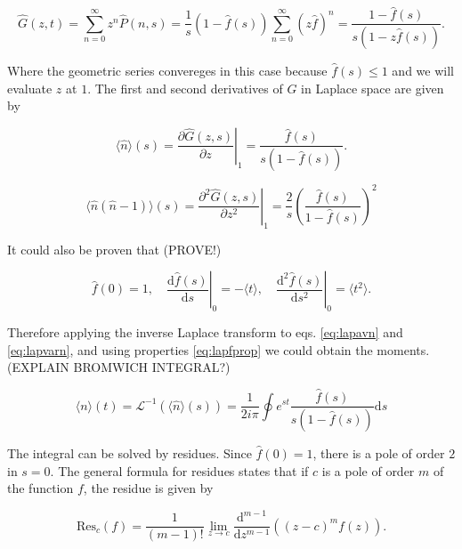 \begin{equation}
  \label{eq:lapG}
  \hat{G}(z,t) = \sum_{n=0}^{\infty}z^n\hat{P}(n,s) = \frac{1}{s}(1-\hat{f}(s))\sum_{n=0}^{\infty}(z\hat{f})^n=\frac{1-\hat{f}(s)}{s(1-z\hat{f}(s))}.
\end{equation}

Where the geometric series convereges in this case because $\hat{f}(s)\leq1$ and we will evaluate $z$ at $1$. The first and second derivatives of $G$ in Laplace space are given by

\begin{equation}
  \label{eq:lapavn}
  \langle\hat{n}\rangle(s) = \left.\frac{\partial\hat{G}(z,s)}{\partial z}\right|_1 = \frac{\hat{f}(s)}{s(1-\hat{f}(s))}.
\end{equation}

\begin{equation}
  \label{eq:lapvarn}
  \langle\hat{n}(\hat{n}-1)\rangle(s) = \left.\frac{\partial^2\hat{G}(z,s)}{\partial z^2}\right|_1 = \frac{2}{s}\left(\frac{\hat{f}(s)}{1-\hat{f}(s)}\right)^2
\end{equation}

It could also be proven that (PROVE!)

\begin{equation}
  \label{eq:lapfprop}
  \hat{f}(0) = 1, \quad \left.\frac{\mathrm{d}\hat{f}(s)}{\mathrm{d}s}\right|_0=-\langle t\rangle,\quad \left.\frac{\mathrm{d}^2\hat{f}(s)}{\mathrm{d}s^2}\right|_0=\langle t^2\rangle.
\end{equation}

Therefore applying the inverse Laplace transform to eqs. \ref{eq:lapavn} and \ref{eq:lapvarn}, and using properties \ref{eq:lapfprop} we could obtain the moments. 
(EXPLAIN BROMWICH INTEGRAL?)

\begin{equation}
  \langle n\rangle(t) = \mathcal{L}^{-1}(\langle\hat{n}\rangle(s))=\frac{1}{2i\pi}\oint e^{st}\frac{\hat{f}(s)}{s(1-\hat{f}(s))}\mathrm{d}s
\end{equation}

The integral can be solved by residues. Since $\hat{f}(0)=1$, there is a pole of order $2$ in $s=0$. The general formula for residues states that if $c$ is a pole of order $m$ of the function $f$, the residue is given by

\begin{equation}
  \label{eq:residues}
  \text{Res}_c(f)=\frac{1}{(m-1)!}\lim_{z\to c}\frac{\mathrm{d}^{m-1}}{\mathrm{d}z^{m-1}}((z-c)^mf(z)).
\end{equation}

